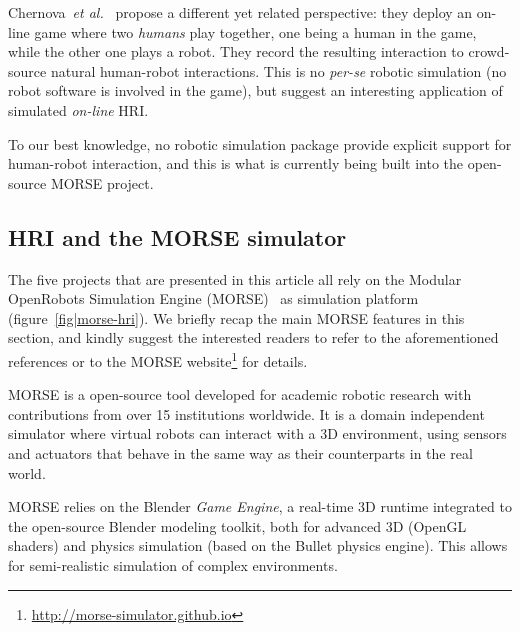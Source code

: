 \documentclass[conference]{IEEEtran}
\newcommand{\etal}{{\textit{et al.~}}}
\begin{document}
Chernova~\etal\cite{Chernova2011} propose a different yet related perspective:
they deploy an on-line game where two \emph{humans} play together, one being a
human in the game, while the other one plays a robot. They record the resulting
interaction to crowd-source natural human-robot interactions. This is no
\textit{per-se} robotic simulation (no robot software is involved in the game),
but suggest an interesting application of simulated \emph{on-line} HRI.




To our best knowledge, no robotic simulation package provide explicit support
for human-robot interaction, and this is what is currently being built into the
open-source MORSE project.

\subsection*{HRI and the MORSE simulator}

The five projects that are presented in this article all rely on the Modular
OpenRobots Simulation Engine (MORSE)~\cite{Echeverria2011, morse_simpar_2012} as
simulation platform (figure~\ref{fig|morse-hri}). We briefly recap the main
MORSE features in this section, and kindly suggest the interested readers to
refer to the aforementioned references or to the MORSE
website\footnote{\url{http://morse-simulator.github.io}} for details.

MORSE is a open-source tool developed for academic robotic research with
contributions from over 15 institutions worldwide. It is a domain independent
simulator where virtual robots can interact with a 3D environment, using
sensors and actuators that behave in the same way as their counterparts in the
real world.

MORSE relies on the Blender \emph{Game Engine}, a real-time 3D runtime
integrated to the open-source Blender modeling toolkit, both for advanced 3D
(OpenGL shaders) and physics simulation (based on the {\sc Bullet} physics
engine). This allows for semi-realistic simulation of complex environments.
\end{document}
